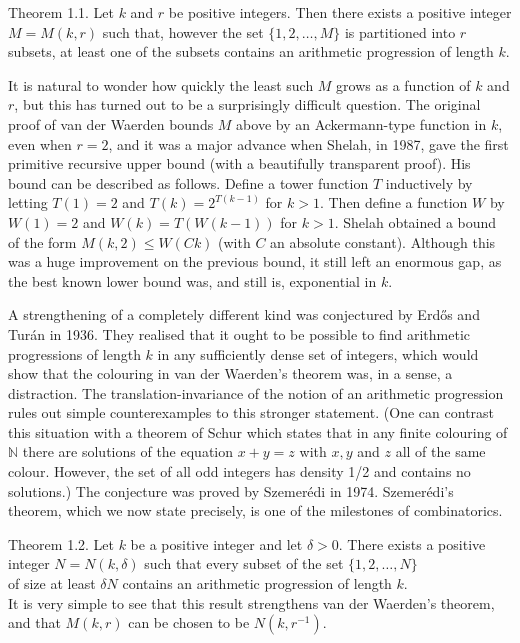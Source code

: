 \documentclass[10pt]{article}
\begin{document}
Theorem 1.1. Let $k$ and $r$ be positive integers. Then there exists a positive integer $M=M(k, r)$ such that, however the set $\{1,2, \ldots, M\}$ is partitioned into $r$ subsets, at least one of the subsets contains an arithmetic progression of length $k$.

It is natural to wonder how quickly the least such $M$ grows as a function of $k$ and $r$, but this has turned out to be a surprisingly difficult question. The original proof of van der Waerden bounds $M$ above by an Ackermann-type function in $k$, even when $r=2$, and it was a major advance when Shelah, in 1987, gave the first primitive recursive upper bound (with a beautifully transparent proof). His bound can be described as follows. Define a tower function $T$ inductively by letting $T(1)=2$ and $T(k)=2^{T(k-1)}$ for $k>1$. Then define a function $W$ by $W(1)=2$ and $W(k)=T(W(k-1))$ for $k>1$. Shelah obtained a bound of the form $M(k, 2) \leqslant W(C k)$ (with $C$ an absolute constant). Although this was a huge improvement on the previous bound, it still left an enormous gap, as the best known lower bound was, and still is, exponential in $k$.

A strengthening of a completely different kind was conjectured by Erdős and Turán in 1936. They realised that it ought to be possible to find arithmetic progressions of length $k$ in any sufficiently dense set of integers, which would show that the colouring in van der Waerden's theorem was, in a sense, a distraction. The translation-invariance of the notion of an arithmetic progression rules out simple counterexamples to this stronger statement. (One can contrast this situation with a theorem of Schur which states that in any finite colouring of $\mathbb{N}$ there are solutions of the equation $x+y=z$ with $x, y$ and $z$ all of the same colour. However, the set of all odd integers has density 1/2 and contains no solutions.) The conjecture was proved by Szemerédi in 1974. Szemerédi's theorem, which we now state precisely, is one of the milestones of combinatorics.

Theorem 1.2. Let $k$ be a positive integer and let $\delta>0$. There exists a positive integer $N=N(k, \delta)$ such that every subset of the set $\{1,2, \ldots, N\}$\\
of size at least $\delta N$ contains an arithmetic progression of length $k$.\\
It is very simple to see that this result strengthens van der Waerden's theorem, and that $M(k, r)$ can be chosen to be $N\left(k, r^{-1}\right)$.
\end{document}
